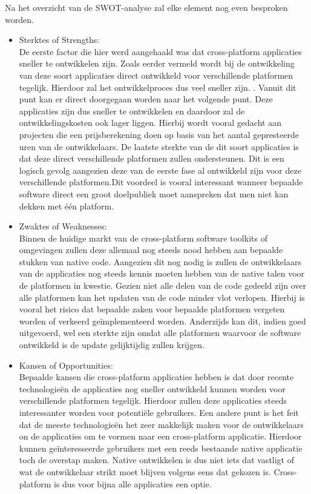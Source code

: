 Na het overzicht van de SWOT-analyse zal elke element nog even besproken worden. 
\begin{itemize}
    \item Sterktes of Strengths:\\
    De eerste factor die hier werd aangehaald was dat cross-platform applicaties sneller te ontwikkelen zijn. Zoals eerder vermeld wordt bij de ontwikkeling van deze soort applicaties direct ontwikkeld voor verschillende platformen tegelijk. Hierdoor zal het ontwikkelproces dus veel sneller zijn. . Vanuit dit punt kan er direct doorgegaan worden naar het volgende punt. Deze applicaties zijn dus sneller te ontwikkelen  en daardoor zal de ontwikkelingskosten ook lager liggen. Hierbij wordt vooral gedacht aan projecten die een prijsberekening doen op basis van het aantal gepresteerde uren van de ontwikkelaars. De laatste sterkte van de dit soort applicaties is dat deze direct verschillende platformen zullen ondersteunen. Dit is een logisch gevolg aangezien deze van de eerste fase al ontwikkeld zijn voor deze verschillende platformen.Dit voordeel is vooral interessant wanneer bepaalde software direct een groot doelpubliek moet aanspreken dat men niet kan dekken met één platform.
    \\
    
    \item Zwaktes of Weaknesses:\\
    Binnen de huidige markt van de cross-platform software toolkits of omgevingen zullen deze allemaal nog steeds nood hebben aan bepaalde stukken van native code. Aangezien dit nog nodig is zullen de ontwikkelaars van de applicaties nog steeds kennis moeten hebben van de native talen voor de platformen in kwestie. Gezien niet alle delen van de code gedeeld zijn over alle platformen kan het updaten van de code minder vlot verlopen. Hierbij is vooral het risico dat bepaalde zaken voor bepaalde platformen vergeten worden of verkeerd geïmplementeerd worden. Anderzijds kan dit, indien goed uitgevoerd, wel een sterkte zijn omdat alle platformen waarvoor de software ontwikkeld is de update gelijktijdig zullen krijgen.
    \\
    
    \item Kansen of Opportunities:\\
    Bepaalde kansen die cross-platform applicaties hebben is dat door recente technologieën de applicaties nog sneller ontwikkeld kunnen worden voor verschillende platformen tegelijk. Hierdoor zullen deze applicaties steeds interessanter worden voor potentiële gebruikers. Een andere punt is het feit dat de meeste technologieën het zeer makkelijk maken voor de ontwikkelaars on de applicaties om te vormen naar een cross-platform applicatie. Hierdoor kunnen geïnteresseerde gebruikers met een reeds bestaande native applicatie toch de overstap maken. Native ontwikkelen is dus niet iets dat vastligt of wat de ontwikkelaar strikt moet blijven volgens eens dat gekozen is. Cross-platform is dus voor bijna alle applicaties een optie. 
    \\
    

\end{itemize}
